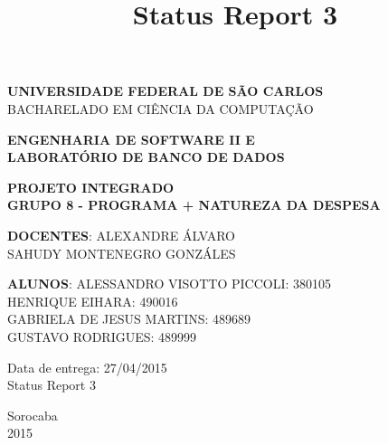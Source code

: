 \documentclass[a4paper,12pt]{article}
\title{Status Report 3}
\begin{document}
\renewcommand*\sectionmark[1]{\markboth{#1}{}}
\renewcommand*\subsectionmark[1]{\markboth{#1}{}}


\begin{titlepage}
\begin{center}
{\bf \large UNIVERSIDADE FEDERAL DE SÃO CARLOS}\\[0.2cm]
{\large BACHARELADO EM CIÊNCIA DA COMPUTAÇÃO}\\[0.2cm]

\end{center}

\vfill
\begin{center}
{\bf \large ENGENHARIA DE SOFTWARE II E\\LABORATÓRIO DE BANCO DE DADOS}\\[3.2cm]
\end{center}

\begin{center}
{\bf \LARGE PROJETO INTEGRADO}\\[0.3cm]
{\bf \Large GRUPO 8 - PROGRAMA + NATUREZA DA DESPESA}\\[2.2cm]
\end{center}

\vfill
\begin{flushright}
{\large \textbf{DOCENTES}: ALEXANDRE ÁLVARO}\\[0.2cm]
{\large SAHUDY MONTENEGRO GONZÁLES}\\[0.5cm]
\end{flushright}

\vfill
\begin{flushright}
{\large {\bf ALUNOS}: ALESSANDRO VISOTTO PICCOLI: 380105}\\[0.15cm]
{\large HENRIQUE EIHARA: 490016}\\[0.15cm]
{\large GABRIELA DE JESUS MARTINS: 489689}\\[0.15cm]
{\large GUSTAVO RODRIGUES: 489999}\\[0.15cm]
\end{flushright}

\vfill
\begin{flushright}
{\large Data de entrega: 27/04/2015}\\[0.2cm]
{\large Status Report 3}\\[2.0cm]
\end{flushright}

\begin{center}
{\large Sorocaba}\\[0.2cm]
{\large 2015}
\end{center}

\end{titlepage}
\end{document}
